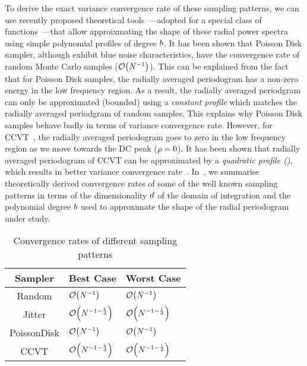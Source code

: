\documentclass[11pt,fleqn]{book} %
\begin{document}
To derive the exact variance convergence rate of these sampling patterns, we can use recently proposed theoretical tools~\cite{Pilleboue:2015:VAM}---adopted for a special class of functions~\cite{brandolini2001}---that allow approixmating the shape of these radial power spectra using simple polynomial profiles of degree $b$. It has been shown that Poisson Disk sampler, although exhibit blue noise characteristics, have the convergence rate of random Monte Carlo samples ($\mathcal{O}\!\left(N^{-1}\right)$). This can be explained from the fact that for Poisson Disk samples, the radially averaged periodogram has a non-zero energy in the low frequency region. As a result, the  radially averaged periodgram can only be approximated (bounded) using a \emph{constant profile} which matches the radially averaged periodgram of random samples. This explains why Poisson Disk samples  behave badly in terms of variance convergence rate. However, for CCVT~\cite{Balzer:2009:CPD:1531326.1531392}, the radially averaged periodogram goes to zero in the low frequency region as we move towards the DC peak ($\rho=0$). It has been shown that radially averaged periodogram of CCVT can be approximated by a \emph{quadratic profile ()}, which results in better variance convergence rate~\cite{Pilleboue:2015:VAM}. In~, we summarise theoretically derived convergence rates of some of the well known sampling patterns in terms of the dimensionality ${d}$ of the domain of integration and the polynomial degree $b$ used to approximate the shape of the radial periodogram under study. 

\begin{table}[ht]
  \centering
  \caption{Convergence rates of different sampling patterns}
  \label{tab:convergencerates}
  \begin{tabular}{|c|l|l|}
    \hline
    Sampler & Best Case & Worst Case \\
    \hline
    Random & $\mathcal{O}\!\left(N^{-1}\right)$ & $\mathcal{O}\!\left(N^{-1}\right)$ \\
    Jitter &  $\mathcal{O}\!\left(N^{-1-\frac{b}{d}}\right)$ & $\mathcal{O}\!\left(N^{-1-\frac{1}{d}}\right)$\\ 
    PoissonDisk & $\mathcal{O}\!\left(N^{-1}\right)$ & $\mathcal{O}\!\left(N^{-1}\right)$\\
    CCVT & $\mathcal{O}\!\left(N^{-1-\frac{b}{d}}\right)$ & $\mathcal{O}\!\left(N^{-1-\frac{1}{d}}\right)$ \\ 
    \hline
  \end{tabular}
\end{table}
\end{document}
